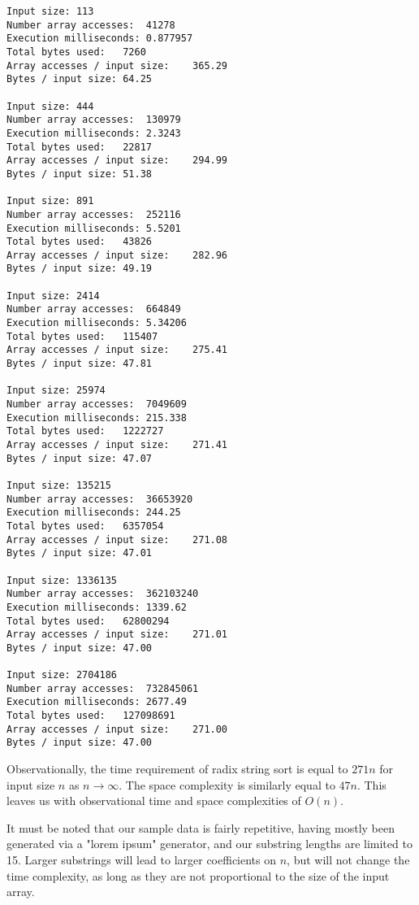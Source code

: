\documentclass[12pt]{amsart}
\begin{document}
\begin{verbatim}
Input size:	113
Number array accesses:	41278
Execution milliseconds:	0.877957
Total bytes used:	7260
Array accesses / input size:    365.29
Bytes / input size: 64.25

Input size:	444
Number array accesses:	130979
Execution milliseconds:	2.3243
Total bytes used:	22817
Array accesses / input size:    294.99
Bytes / input size: 51.38

Input size:	891
Number array accesses:	252116
Execution milliseconds:	5.5201
Total bytes used:	43826
Array accesses / input size:    282.96
Bytes / input size: 49.19

Input size:	2414
Number array accesses:	664849
Execution milliseconds:	5.34206
Total bytes used:	115407
Array accesses / input size:    275.41
Bytes / input size: 47.81

Input size:	25974
Number array accesses:	7049609
Execution milliseconds:	215.338
Total bytes used:	1222727
Array accesses / input size:    271.41
Bytes / input size: 47.07

Input size:	135215
Number array accesses:	36653920
Execution milliseconds:	244.25
Total bytes used:	6357054
Array accesses / input size:    271.08
Bytes / input size: 47.01

Input size:	1336135
Number array accesses:	362103240
Execution milliseconds:	1339.62
Total bytes used:	62800294
Array accesses / input size:    271.01
Bytes / input size: 47.00

Input size:	2704186
Number array accesses:	732845061
Execution milliseconds:	2677.49
Total bytes used:	127098691
Array accesses / input size:    271.00
Bytes / input size: 47.00

\end{verbatim}

    Observationally, the time requirement of radix string sort
    is equal to $271n$ for input size $n$ as $n \to \infty$. The
    space complexity is similarly equal to $47n$. This leaves
    us with observational time and space complexities of $O(n)$.

    It must be noted that our sample data is fairly repetitive,
    having mostly been generated via a "lorem ipsum" generator,
    and our substring lengths are limited to 15. Larger
    substrings will lead to larger coefficients on $n$, but will
    not change the time complexity, as long as they are not
    proportional to the size of the input array.
\end{document}
